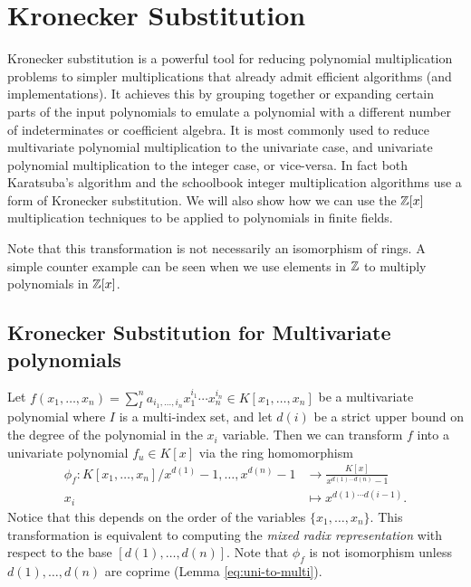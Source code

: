 \medskip

\section{Kronecker Substitution}%
\label{sub:kronecker_substitution}

Kronecker substitution is a powerful tool for reducing polynomial multiplication problems to simpler multiplications that already admit efficient algorithms (and implementations). It achieves this by grouping together or expanding certain parts of the input polynomials to emulate a polynomial with a different number of indeterminates or coefficient algebra. It is most commonly used to reduce multivariate polynomial multiplication to the univariate case, and univariate polynomial multiplication to the integer case, or vice-versa. In fact both Karatsuba's algorithm and the schoolbook integer multiplication algorithms use a form of Kronecker substitution. We will also show how we can use the ${\mathbb Z}[x]$ multiplication techniques to be applied to polynomials in finite fields.

Note that this transformation is not necessarily an isomorphism of rings. A simple counter example can be seen when we use elements in ${\mathbb Z}$ to multiply polynomials in ${\mathbb Z}[x]$.

\medskip

\subsection{Kronecker Substitution for Multivariate polynomials}

Let $f(x_1, \ldots, x_n) = \sum^n_{I}a_{i_1, \ldots, i_n}x_1^{i_1}\cdots x_n^{i_n} \in K[x_1, \ldots, x_n]$ be a multivariate polynomial where $I$ is a multi-index set, and let $d(i)$ be a strict upper bound on the degree of the polynomial in the $x_i$ variable. Then we can transform $f$ into a univariate polynomial $f_u \in K[x]$ via the ring homomorphism
\begin{align*}
    \phi_f: K[x_1, \ldots, x_n]/{x^{d(1)} - 1, \ldots, x^{d(n)} - 1} &\to \frac{K[x]}{x^{d(1) \cdots d(n)} - 1}\\
    x_i &\mapsto x^{d(1) \cdots d(i-1)}.
\end{align*}
Notice that this depends on the order of the variables $\{x_1, \ldots, x_n\}$. This transformation is equivalent to computing the \emph{mixed radix representation} with respect to the base $[d(1), \ldots, d(n)]$. Note that $\phi_f$ is not isomorphism unless $d(1), \ldots, d(n)$ are coprime (Lemma \ref{eq:uni-to-multi}).

